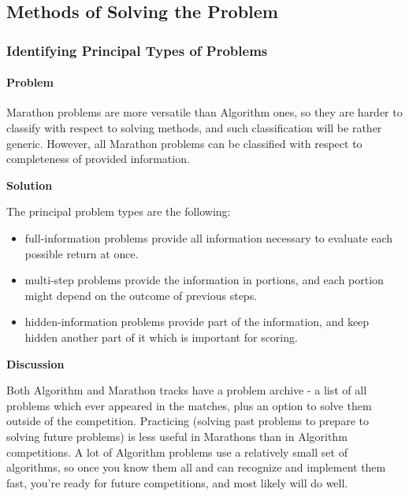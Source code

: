 \hypertarget{methods-of-solving-the-problem}{%
\subsection{Methods of Solving the
Problem}\label{methods-of-solving-the-problem}}

\hypertarget{identifying-principal-types-of-problems}{%
\subsubsection{Identifying Principal Types of
Problems}\label{identifying-principal-types-of-problems}}

\hypertarget{problem}{%
\paragraph{Problem}\label{problem}}

Marathon problems are more versatile than Algorithm ones, so they are
harder to classify with respect to solving methods, and such
classification will be rather generic. However, all Marathon problems
can be classified with respect to completeness of provided information.

\textbf{Solution}

The principal problem types are the following:

\begin{itemize}
\item
  full-information problems provide all information necessary to
  evaluate each possible return at once.
\item
  multi-step problems provide the information in portions, and each
  portion might depend on the outcome of previous steps.
\item
  hidden-information problems provide part of the information, and keep
  hidden another part of it which is important for scoring.
\end{itemize}

\textbf{Discussion}

Both Algorithm and Marathon tracks have a problem archive - a list of
all problems which ever appeared in the matches, plus an option to solve
them outside of the competition. Practicing (solving past problems to
prepare to solving future problems) is less useful in Marathons than in
Algorithm competitions. A lot of Algorithm problems use a relatively
small set of algorithms, so once you know them all and can recognize and
implement them fast, you're ready for future competitions, and most
likely will do well.

